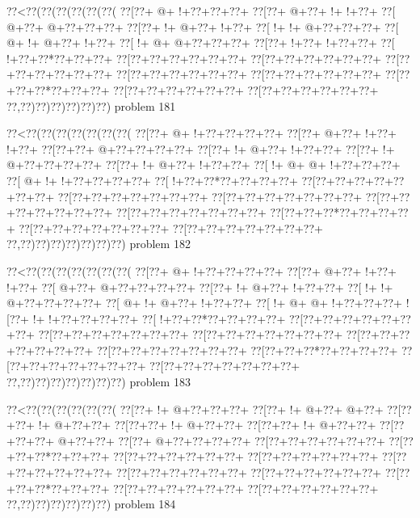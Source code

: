 \vbox{\vbox{\goo
\0??<\0??(\0??(\0??(\0??(\0??(\0??(
\0??[\0??+\- @+\- !+\0??+\0??+\0??+
\0??[\0??+\- @+\0??+\- !+\- !+\0??+
\0??[\- @+\0??+\- @+\0??+\0??+\0??+
\0??[\0??+\- !+\- @+\0??+\- !+\0??+
\0??[\- !+\- !+\- @+\0??+\0??+\0??+
\0??[\- @+\- !+\- @+\0??+\- !+\0??+
\0??[\- !+\- @+\- @+\0??+\0??+\0??+
\0??[\0??+\- !+\0??+\- !+\0??+\0??+
\0??[\- !+\0??+\0??*\0??+\0??+\0??+
\0??[\0??+\0??+\0??+\0??+\0??+\0??+
\0??[\0??+\0??+\0??+\0??+\0??+\0??+
\0??[\0??+\0??+\0??+\0??+\0??+\0??+
\0??[\0??+\0??+\0??+\0??+\0??+\0??+
\0??[\0??+\0??+\0??+\0??+\0??+\0??+
\0??[\0??+\0??+\0??*\0??+\0??+\0??+
\0??[\0??+\0??+\0??+\0??+\0??+\0??+
\0??[\0??+\0??+\0??+\0??+\0??+\0??+
\0??,\0??)\0??)\0??)\0??)\0??)\0??)
}
\hfil problem 181\hfil\break
}

\vbox{\vbox{\goo
\0??<\0??(\0??(\0??(\0??(\0??(\0??(\0??(
\0??[\0??+\- @+\- !+\0??+\0??+\0??+\0??+
\0??[\0??+\- @+\0??+\- !+\0??+\- !+\0??+
\0??[\0??+\0??+\- @+\0??+\0??+\0??+\0??+
\0??[\0??+\- !+\- @+\0??+\- !+\0??+\0??+
\0??[\0??+\- !+\- @+\0??+\0??+\0??+\0??+
\0??[\0??+\- !+\- @+\0??+\- !+\0??+\0??+
\0??[\- !+\- @+\- @+\- !+\0??+\0??+\0??+
\0??[\- @+\- !+\- !+\0??+\0??+\0??+\0??+
\0??[\- !+\0??+\0??*\0??+\0??+\0??+\0??+
\0??[\0??+\0??+\0??+\0??+\0??+\0??+\0??+
\0??[\0??+\0??+\0??+\0??+\0??+\0??+\0??+
\0??[\0??+\0??+\0??+\0??+\0??+\0??+\0??+
\0??[\0??+\0??+\0??+\0??+\0??+\0??+\0??+
\0??[\0??+\0??+\0??+\0??+\0??+\0??+\0??+
\0??[\0??+\0??+\0??*\0??+\0??+\0??+\0??+
\0??[\0??+\0??+\0??+\0??+\0??+\0??+\0??+
\0??[\0??+\0??+\0??+\0??+\0??+\0??+\0??+
\0??,\0??)\0??)\0??)\0??)\0??)\0??)\0??)
}
\hfil problem 182\hfil\break
}

\vbox{\vbox{\goo
\0??<\0??(\0??(\0??(\0??(\0??(\0??(\0??(
\0??[\0??+\- @+\- !+\0??+\0??+\0??+\0??+
\0??[\0??+\- @+\0??+\- !+\0??+\- !+\0??+
\0??[\- @+\0??+\- @+\0??+\0??+\0??+\0??+
\0??[\0??+\- !+\- @+\0??+\- !+\0??+\0??+
\0??[\- !+\- !+\- @+\0??+\0??+\0??+\0??+
\0??[\- @+\- !+\- @+\0??+\- !+\0??+\0??+
\0??[\- !+\- @+\- @+\- !+\0??+\0??+\0??+
\- ![\0??+\- !+\- !+\0??+\0??+\0??+\0??+
\0??[\- !+\0??+\0??*\0??+\0??+\0??+\0??+
\0??[\0??+\0??+\0??+\0??+\0??+\0??+\0??+
\0??[\0??+\0??+\0??+\0??+\0??+\0??+\0??+
\0??[\0??+\0??+\0??+\0??+\0??+\0??+\0??+
\0??[\0??+\0??+\0??+\0??+\0??+\0??+\0??+
\0??[\0??+\0??+\0??+\0??+\0??+\0??+\0??+
\0??[\0??+\0??+\0??*\0??+\0??+\0??+\0??+
\0??[\0??+\0??+\0??+\0??+\0??+\0??+\0??+
\0??[\0??+\0??+\0??+\0??+\0??+\0??+\0??+
\0??,\0??)\0??)\0??)\0??)\0??)\0??)\0??)
}
\hfil problem 183\hfil\break
}

\vbox{\vbox{\goo
\0??<\0??(\0??(\0??(\0??(\0??(\0??(
\0??[\0??+\- !+\- @+\0??+\0??+\0??+
\0??[\0??+\- !+\- @+\0??+\- @+\0??+
\0??[\0??+\0??+\- !+\- @+\0??+\0??+
\0??[\0??+\0??+\- !+\- @+\0??+\0??+
\0??[\0??+\0??+\- !+\- @+\0??+\0??+
\0??[\0??+\0??+\0??+\- @+\0??+\0??+
\0??[\0??+\- @+\0??+\0??+\0??+\0??+
\0??[\0??+\0??+\0??+\0??+\0??+\0??+
\0??[\0??+\0??+\0??*\0??+\0??+\0??+
\0??[\0??+\0??+\0??+\0??+\0??+\0??+
\0??[\0??+\0??+\0??+\0??+\0??+\0??+
\0??[\0??+\0??+\0??+\0??+\0??+\0??+
\0??[\0??+\0??+\0??+\0??+\0??+\0??+
\0??[\0??+\0??+\0??+\0??+\0??+\0??+
\0??[\0??+\0??+\0??*\0??+\0??+\0??+
\0??[\0??+\0??+\0??+\0??+\0??+\0??+
\0??[\0??+\0??+\0??+\0??+\0??+\0??+
\0??,\0??)\0??)\0??)\0??)\0??)\0??)
}
\hfil problem 184\hfil\break
}

